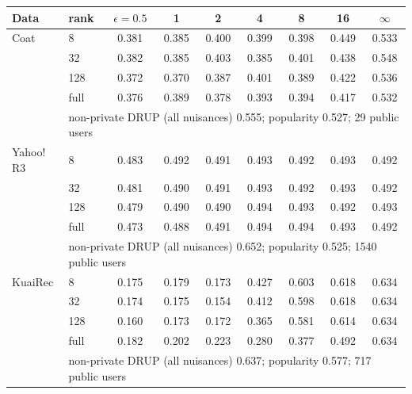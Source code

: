 \begin{tabular}{llccccccc}
\toprule
Data & rank & $\epsilon=0.5$ & 1 & 2 & 4 & 8 & 16 & $\infty$\\
\midrule
Coat & 8 & 0.381 & 0.385 & 0.400 & 0.399 & 0.398 & 0.449 & 0.533\\
 & 32 & 0.382 & 0.385 & 0.403 & 0.385 & 0.401 & 0.438 & 0.548\\
 & 128 & 0.372 & 0.370 & 0.387 & 0.401 & 0.389 & 0.422 & 0.536\\
 & full & 0.376 & 0.389 & 0.378 & 0.393 & 0.394 & 0.417 & 0.532\\
 & \multicolumn{8}{l}{\footnotesize non-private DRUP (all nuisances) 0.555; popularity 0.527; 29 public users}\\
\midrule
Yahoo!\,R3 & 8 & 0.483 & 0.492 & 0.491 & 0.493 & 0.492 & 0.493 & 0.492\\
 & 32 & 0.481 & 0.490 & 0.491 & 0.493 & 0.492 & 0.493 & 0.492\\
 & 128 & 0.479 & 0.490 & 0.490 & 0.494 & 0.493 & 0.492 & 0.493\\
 & full & 0.473 & 0.488 & 0.491 & 0.494 & 0.494 & 0.493 & 0.492\\
 & \multicolumn{8}{l}{\footnotesize non-private DRUP (all nuisances) 0.652; popularity 0.525; 1540 public users}\\
\midrule
KuaiRec & 8 & 0.175 & 0.179 & 0.173 & 0.427 & 0.603 & 0.618 & 0.634\\
 & 32 & 0.174 & 0.175 & 0.154 & 0.412 & 0.598 & 0.618 & 0.634\\
 & 128 & 0.160 & 0.173 & 0.172 & 0.365 & 0.581 & 0.614 & 0.634\\
 & full & 0.182 & 0.202 & 0.223 & 0.280 & 0.377 & 0.492 & 0.634\\
 & \multicolumn{8}{l}{\footnotesize non-private DRUP (all nuisances) 0.637; popularity 0.577; 717 public users}\\
\bottomrule
\end{tabular}
